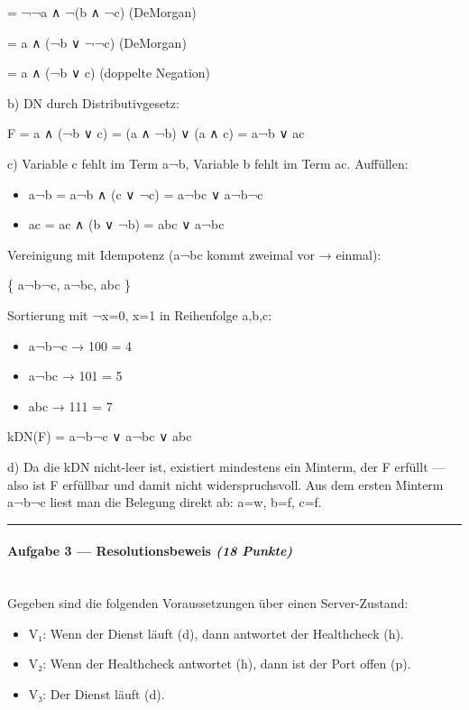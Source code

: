 \documentclass[11pt, a4paper]{article}
\begin{document}
= ¬¬a ∧ ¬(b ∧ ¬c) (DeMorgan)

= a ∧ (¬b ∨ ¬¬c) (DeMorgan)

= a ∧ (¬b ∨ c) (doppelte Negation)


b) DN durch Distributivgesetz:

F = a ∧ (¬b ∨ c) = (a ∧ ¬b) ∨ (a ∧ c) = a¬b ∨ ac


c) Variable c fehlt im Term a¬b, Variable b fehlt im Term ac. Auffüllen:

\begin{itemize}
  \item a¬b = a¬b ∧ (c ∨ ¬c) = a¬bc ∨ a¬b¬c
  \item ac = ac ∧ (b ∨ ¬b) = abc ∨ a¬bc
\end{itemize}

Vereinigung mit Idempotenz (a¬bc kommt zweimal vor → einmal):

\{ a¬b¬c, a¬bc, abc \}


Sortierung mit ¬x=0, x=1 in Reihenfolge a,b,c:

\begin{itemize}
  \item a¬b¬c → 100 = 4
  \item a¬bc → 101 = 5
  \item abc → 111 = 7
\end{itemize}

kDN(F) = a¬b¬c ∨ a¬bc ∨ abc


d) Da die kDN nicht-leer ist, existiert mindestens ein Minterm, der F erfüllt — also ist F erfüllbar und damit nicht widerspruchsvoll. Aus dem ersten Minterm a¬b¬c liest man die Belegung direkt ab: a=w, b=f, c=f.



\noindent\textcolor{rulegray}{\rule{\linewidth}{0.4pt}}


\paragraph{Aufgabe 3 — Resolutionsbeweis \textit{(18 Punkte)}}\mbox{}\\[2pt]

Gegeben sind die folgenden Voraussetzungen über einen Server-Zustand:


\begin{itemize}
  \item V₁: Wenn der Dienst läuft (d), dann antwortet der Healthcheck (h).
  \item V₂: Wenn der Healthcheck antwortet (h), dann ist der Port offen (p).
  \item V₃: Der Dienst läuft (d).
\end{itemize}
\end{document}
